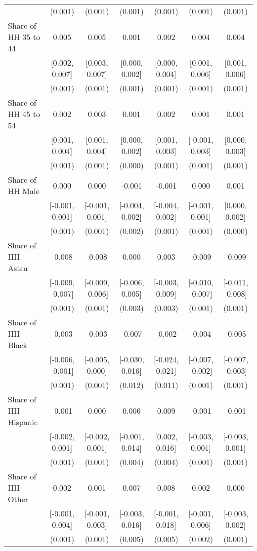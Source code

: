 \begin{table}[H]
\begin{table}[H]
\begin{tabular}[t]{lcccccc}
 & (0.001) & (0.001) & (0.001) & (0.001) & (0.001) & \vphantom{1} (0.001)\\
Share of HH 35 to 44 & 0.005 & 0.005 & 0.001 & 0.002 & 0.004 & 0.004\\
 & [0.002, 0.007] & [0.003, 0.007] & [0.000, 0.002] & [0.000, 0.004] & [0.001, 0.006] & [0.001, 0.006]\\
 & (0.001) & (0.001) & (0.001) & (0.001) & (0.001) & (0.001)\\
Share of HH 45 to 54 & 0.002 & 0.003 & 0.001 & 0.002 & 0.001 & 0.001\\
 & [0.001, 0.004] & [0.001, 0.004] & [0.000, 0.002] & [0.001, 0.003] & [-0.001, 0.003] & [0.000, 0.003]\\
 & (0.001) & (0.001) & (0.000) & (0.001) & (0.001) & (0.001)\\
Share of HH Male & 0.000 & 0.000 & -0.001 & -0.001 & 0.000 & 0.001\\
 & [-0.001, 0.001] & [-0.001, 0.001] & [-0.004, 0.002] & [-0.004, 0.002] & [-0.001, 0.001] & [0.000, 0.002]\\
 & (0.001) & (0.001) & (0.002) & (0.001) & (0.001) & (0.000)\\
Share of HH Asian & -0.008 & -0.008 & 0.000 & 0.003 & -0.009 & -0.009\\
 & [-0.009, -0.007] & [-0.009, -0.006] & [-0.006, 0.005] & [-0.003, 0.009] & [-0.010, -0.007] & [-0.011, -0.008]\\
 & (0.001) & (0.001) & (0.003) & (0.003) & (0.001) & (0.001)\\
Share of HH Black & -0.003 & -0.003 & -0.007 & -0.002 & -0.004 & -0.005\\
 & [-0.006, -0.001] & [-0.005, 0.000] & [-0.030, 0.016] & [-0.024, 0.021] & [-0.007, -0.002] & [-0.007, -0.003]\\
 & (0.001) & (0.001) & (0.012) & (0.011) & (0.001) & (0.001)\\
Share of HH Hispanic & -0.001 & 0.000 & 0.006 & 0.009 & -0.001 & -0.001\\
 & [-0.002, 0.001] & [-0.002, 0.001] & [-0.001, 0.014] & [0.002, 0.016] & [-0.003, 0.001] & [-0.003, 0.001]\\
 & (0.001) & (0.001) & (0.004) & (0.004) & (0.001) & (0.001)\\
Share of HH Other & 0.002 & 0.001 & 0.007 & 0.008 & 0.002 & 0.000\\
 & [-0.001, 0.004] & [-0.001, 0.003] & [-0.003, 0.016] & [-0.001, 0.018] & [-0.001, 0.006] & [-0.003, 0.002]\\
 & (0.001) & (0.001) & (0.005) & (0.005) & (0.002) & (0.001)\\

\end{tabular}
\end{table}
\end{table}
